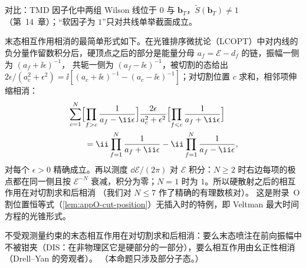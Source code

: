 对比：TMD 因子化中两组 Wilson 线位于 $0$ 与 $\mathbf b_T$，$\tilde S(\mathbf b_T)\ne1$（第~14~章）；“软因子为 $1$”只对共线单举截面成立。

末态相互作用相消的最简单形式如下。在光锥排序微扰论（LCOPT）中对内线的负分量作留数积分后，硬顶点之后的部分是能量分母 $a_f=\mathcal E-d_f$ 的链，振幅一侧为 $(a_f+\ii\epsilon)^{-1}$，
共轭一侧为 $(a_f-\ii\epsilon)^{-1}$，被切割的态给出 $2\epsilon/(a_c^2+\epsilon^2)=\ii[(a_c+\ii\epsilon)^{-1}-(a_c-\ii\epsilon)^{-1}]$；对切割位置 $c$ 求和，相邻项伸缩相消：
\begin{equation}\label{eq:method-cutsum}
\begin{aligned}
&\sum_{c=1}^{N}\Bigl[\prod_{f>c}\frac{1}{a_f-\ii\epsilon}\Bigr]\frac{2\epsilon}{a_c^2+\epsilon^2}\Bigl[\prod_{f<c}\frac{1}{a_f+\ii\epsilon}\Bigr]\\
&\qquad=\ii\prod_{f=1}^{N}\frac{1}{a_f+\ii\epsilon}-\ii\prod_{f=1}^{N}\frac{1}{a_f-\ii\epsilon} ,
\end{aligned}
\end{equation}
对每个 $\epsilon>0$ 精确成立。再以测度 $\dd\mathcal E/(2\pi)$ 对 $\mathcal E$ 积分：$N\ge2$ 时右边每项的极点都在同一侧且按 $\mathcal E^{-N}$ 衰减，积分为零；$N=1$ 时为 $1$。所以硬散射之后的相互作用在对切割求和后相消
（我们对 $N\le7$ 作了精确的有理数核对）。%
这是附录~O 割位置恒等式（\cref{lem:appO-cut-position}）无插入时的特例，即 Veltman 最大时间方程的光锥形式。

\begin{proposition}\label{prop:method-fsi}
不受观测量约束的末态相互作用在对切割求和后相消：要么末态喷注在前向振幅中不被钳夹（DIS：在非物理区它是硬部分的一部分），要么相互作用由幺正性相消（Drell--Yan 的旁观者）。
（本命题只涉及部分子态。）
\end{proposition}


